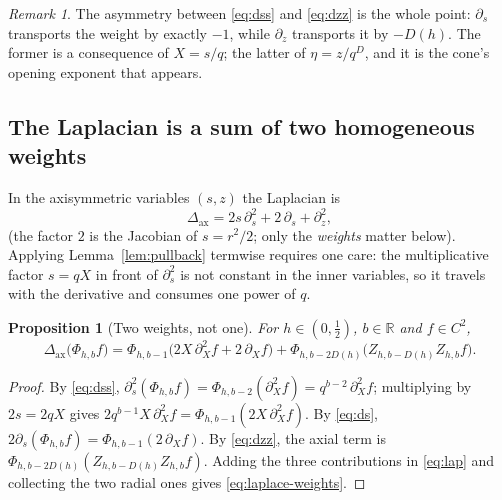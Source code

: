 \documentclass[11pt]{article}
\newcommand{\R}{\mathbb{R}}
\newcommand{\Ph}{\Phi}
\theoremstyle{plain}
\newtheorem{proposition}[theorem]{Proposition}
\theoremstyle{definition}
\theoremstyle{remark}
\newtheorem{remark}[theorem]{Remark}
\begin{document}
\begin{remark}
The asymmetry between \eqref{eq:dss} and \eqref{eq:dzz} is the whole point:
$\partial_s$ transports the weight by exactly $-1$, while $\partial_z$
transports it by $-D(h)$. The former is a consequence of $X=s/q$; the latter of
$\eta=z/q^{D}$, and it is the cone's opening exponent that appears.
\end{remark}

\subsection{The Laplacian is a sum of two homogeneous weights}

In the axisymmetric variables $(s,z)$ the Laplacian is
\begin{equation}
  \Delta_{\mathrm{ax}}
  = 2s\,\partial_s^{2}+2\,\partial_s+\partial_z^{2},
  \label{eq:lap}
\end{equation}
(the factor $2$ is the Jacobian of $s=r^{2}/2$; only the \emph{weights} matter
below). Applying Lemma~\ref{lem:pullback} termwise requires one care: the
multiplicative factor $s=qX$ in front of $\partial_s^{2}$ is not constant in
the inner variables, so it travels with the derivative and consumes one power
of $q$.

\begin{proposition}[Two weights, not one]
\label{prop:three}
For $h\in(0,\tfrac12)$, $b\in\R$ and $f\in C^{2}$,
\begin{equation}
  \Delta_{\mathrm{ax}}\bigl(\Ph_{h,b}f\bigr)
  =
  \Ph_{h,b-1}\bigl(2X\,\partial_X^{2}f+2\,\partial_X f\bigr)
  +\Ph_{h,b-2D(h)}\bigl(Z_{h,b-D(h)}Z_{h,b}f\bigr).
  \label{eq:laplace-weights}
\end{equation}
\end{proposition}

\begin{proof}
By \eqref{eq:dss}, $\partial_s^{2}(\Ph_{h,b}f)=\Ph_{h,b-2}(\partial_X^{2}f)
=q^{b-2}\,\partial_X^{2}f$; multiplying by $2s=2qX$ gives
$2q^{b-1}X\,\partial_X^{2}f=\Ph_{h,b-1}(2X\,\partial_X^{2}f)$. By
\eqref{eq:ds}, $2\partial_s(\Ph_{h,b}f)=\Ph_{h,b-1}(2\,\partial_X f)$. By
\eqref{eq:dzz}, the axial term is $\Ph_{h,b-2D(h)}(Z_{h,b-D(h)}Z_{h,b}f)$.
Adding the three contributions in \eqref{eq:lap} and collecting the two radial
ones gives \eqref{eq:laplace-weights}.
\end{proof}
\end{document}
